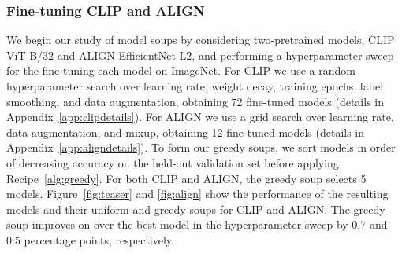 \documentclass[nohyperref]{article}
\theoremstyle{plain}
\theoremstyle{definition}
\theoremstyle{remark}
\begin{document}
    \subsubsection{Fine-tuning CLIP and ALIGN}\label{sec:clipalign}
    
        
        
        
    
        
        We begin our study of model soups by considering two-pretrained models, CLIP ViT-B/32 and ALIGN EfficientNet-L2, and performing a hyperparameter sweep for the fine-tuning each model on ImageNet. For CLIP we use a random hyperparameter search over learning rate, weight decay,
        training epochs, label smoothing, and data augmentation, obtaining 72 fine-tuned models (details in Appendix~\ref{app:clipdetails}).
        For ALIGN we use a grid search over learning rate, data augmentation, and mixup, obtaining 12 fine-tuned models (details in Appendix~\ref{app:aligndetails}).
        To form our greedy soups, we sort models in order of decreasing accuracy on the held-out validation set 
        before applying Recipe~\ref{alg:greedy}.
        For both CLIP and ALIGN, the greedy soup selects 5 models.
        Figure~\ref{fig:teaser} and \ref{fig:align} show the performance of the resulting models and their uniform and greedy soups for CLIP and ALIGN. The greedy soup improves on over the best model in the hyperparameter sweep by 0.7 and 0.5 percentage points, respectively.
        
\end{document}
